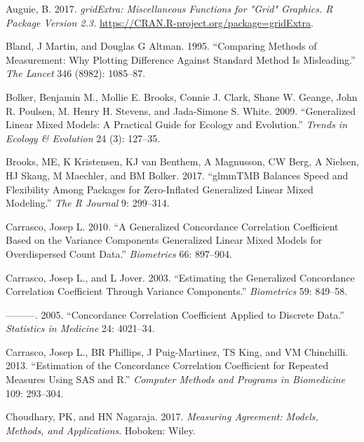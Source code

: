 \hypertarget{refs}{}
\begin{CSLReferences}{1}{0}
\leavevmode{}%
Auguie, B. 2017. \emph{gridExtra: Miscellaneous Functions for "Grid" Graphics. R Package Version 2.3.} \url{https://CRAN.R-project.org/package=gridExtra}.

\leavevmode{}%
Bland, J Martin, and Douglas G Altman. 1995. {``Comparing Methods of Measurement: Why Plotting Difference Against Standard Method Is Misleading.''} \emph{The Lancet} 346 (8982): 1085--87.

\leavevmode{}%
Bolker, Benjamin M., Mollie E. Brooks, Connie J. Clark, Shane W. Geange, John R. Poulsen, M. Henry H. Stevens, and Jada-Simone S. White. 2009. {``Generalized Linear Mixed Models: A Practical Guide for Ecology and Evolution.''} \emph{Trends in Ecology \& Evolution} 24 (3): 127--35.

\leavevmode{}%
Brooks, ME, K Kristensen, KJ van Benthem, A Magnusson, CW Berg, A Nielsen, HJ Skaug, M Maechler, and BM Bolker. 2017. {``glmmTMB Balances Speed and Flexibility Among Packages for Zero-Inflated Generalized Linear Mixed Modeling.''} \emph{The R Journal} 9: 299--314.

\leavevmode{}%
Carrasco, Josep L. 2010. {``A Generalized Concordance Correlation Coefficient Based on the Variance Components Generalized Linear Mixed Models for Overdispersed Count Data.''} \emph{Biometrics} 66: 897--904.

\leavevmode{}%
Carrasco, Josep L., and L Jover. 2003. {``Estimating the Generalized Concordance Correlation Coefficient Through Variance Components.''} \emph{Biometrics} 59: 849--58.

\leavevmode{}%
---------. 2005. {``Concordance Correlation Coefficient Applied to Discrete Data.''} \emph{Statistics in Medicine} 24: 4021--34.

\leavevmode{}%
Carrasco, Josep L., BR Phillips, J Puig-Martinez, TS King, and VM Chinchilli. 2013. {``Estimation of the Concordance Correlation Coefficient for Repeated Measures Using {SAS} and {R}.''} \emph{Computer Methods and Programs in Biomedicine} 109: 293--304.

\leavevmode{}%
Choudhary, PK, and HN Nagaraja. 2017. \emph{Measuring Agreement: Models, Methods, and Applications}. Hoboken: Wiley.


\end{CSLReferences}
